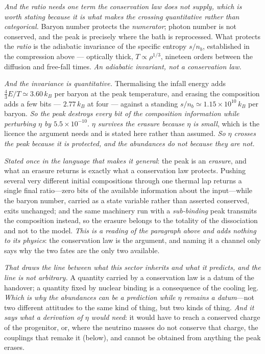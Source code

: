 \documentclass[11pt,a4paper]{article}
\theoremstyle{plain}
\theoremstyle{definition}
\theoremstyle{remark}
\begin{document}
\emph{And the ratio needs one term the conservation law does not supply, which is worth stating because it
is what makes the crossing quantitative rather than categorical.} Baryon number protects the
\emph{numerator}; photon number is not conserved, and the peak is precisely where the bath is reprocessed.
What protects the \emph{ratio} is the adiabatic invariance of the specific entropy $s/n_b$, established in
the compression above --- optically thick, $T\propto\rho^{1/3}$, nineteen orders between the diffusion and
free-fall times. \emph{An adiabatic invariant, not a conservation law.}

\emph{And the invariance is quantitative.} Thermalising the infall energy adds $\tfrac43 E/T\simeq3.60\,k_B$
per baryon at the peak temperature, and erasing the composition adds a few bits --- $2.77\,k_B$ at four ---
against a standing $s/n_b\simeq1.15\times10^{10}\,k_B$ per baryon. \emph{So the peak destroys every bit of
the composition information while perturbing $\eta$ by $5.5\times10^{-10}$.} \emph{$\eta$ survives the
erasure because $\eta$ is small}, which is the licence the argument needs and is stated here rather than
assumed. \emph{So $\eta$ crosses the peak because it is protected, and the abundances do not because they are
not.}

\emph{Stated once in the language that makes it general}: the peak is an \emph{erasure}, and what an erasure returns is exactly what a conservation law protects. Pushing several very different initial compositions through one thermal lap returns a single final ratio---zero bits of the available information about the input---while the baryon number, carried as a state variable rather than asserted conserved, exits unchanged; and the same machinery run with a \emph{sub-binding} peak transmits the composition instead, so the erasure belongs to the totality of the dissociation and not to the model. \emph{This is a reading of the paragraph above and adds nothing to its physics}: the conservation law is the argument, and naming it a channel only says why the two fates are the only two available.

\emph{That draws the line between what this sector inherits and what it predicts, and the line is not
arbitrary.} A quantity carried by a conservation law is a datum of the handover; a quantity fixed by nuclear
binding is a consequence of the cooling leg. \emph{Which is why the abundances can be a prediction while
$\eta$ remains a datum}---not two different attitudes to the same kind of thing, but two kinds of thing.
\emph{And it says what a derivation of $\eta$ would need}: it would have to reach a conserved charge of the
progenitor, or, where the neutrino masses do not conserve that charge, the couplings that remake it (below),
and cannot be obtained from anything the peak erases.
\end{document}
